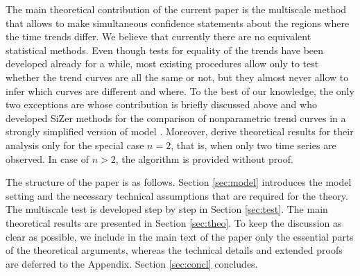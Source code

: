 \documentclass[a4paper,12pt]{article}
\makeatletter
\renewcommand{\eqref}[1]{\tagform@{\ref{#1}}}
\makeatother
\begin{document}


The main theoretical contribution of the current paper is the multiscale method that allows to make simultaneous confidence statements about the regions where the time trends differ. We believe that currently there are no equivalent statistical methods. Even though tests for equality of the trends have been developed already for a while, most existing procedures allow only to test whether the trend curves are all the same or not, but they almost never allow to infer which curves are different and where. To the best of our knowledge, the only two exceptions are \cite{KhismatullinaVogt2021} whose contribution is briefly discussed above and \cite{Park2009} who developed SiZer methods for the comparison of nonparametric trend curves in a strongly simplified version of \linebreak model \eqref{eq:model}. Moreover, \cite{Park2009} derive theoretical results for their analysis only for the special case $n=2$, that is, when only two time series are observed. In case of $n>2$, the algorithm is provided without proof.

The structure of the paper is as follows. Section \ref{sec:model} introduces the model setting and the necessary technical assumptions that are required for the theory. The multiscale test is developed step by step in Section \ref{sec:test}. The main theoretical results are presented in Section \ref{sec:theo}. To keep the discussion as clear as possible, we include in the main text of the paper only the essential parts of the theoretical arguments, whereas the technical details and extended proofs are deferred to the Appendix. Section \ref{sec:concl} concludes.
\end{document}
